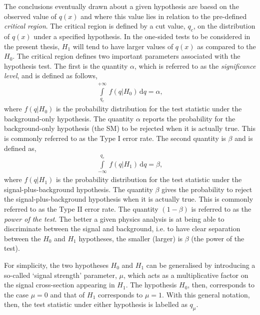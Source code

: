 The conclusions eventually drawn about a given hypothesis are baesd on the observed value
of $q(x)$ and where this value lies in relation to the pre-defined \textit{critical region}.
The critical region is defined by a cut value, $q_c$, on the distribution of $q(x)$ under a specified hypothesis.
In the one-sided tests to be considered in the present thesis, $H_1$
will tend to have larger values of $q(x)$ as compared to the $H_0$.
The critical region defines two important parameters associated with the hypothesis test.
The first is the quantity $\alpha$, which is referred to as the \textit{significance level},
and is defined as follows,
\begin{align}
    \int\limits_{q_c}^{+\infty} \, f(q | H_0) \, \mathrm{d}q = \alpha,
    \label{eq:sig_level}
\end{align}
where $f(q|H_0)$ is the probability distribution for the test statistic under
the background-only hypothesis.
The quantity $\alpha$ reports the probability for the background-only hypothesis (the SM) to be rejected when it is actually
true. This is commonly referred to as the Type I error rate.
The second quantity is $\beta$ and is defined as,
\begin{align}
    \int\limits_{-\infty}^{q_c} \, f(q|H_1) \, \mathrm{d}q = \beta,
    \label{eq:power_level}
\end{align}
where $f(q|H_1)$ is the probability distribution for the test statistic under
the signal-plus-background hypothesis.
The quantity $\beta$ gives the probability to reject the signal-plus-background hypothesis
when it is actually true. This is commonly referred to as the Type II error rate.
The quantity $(1-\beta)$ is referred to as the \textit{power of the test}.
The better a given physics analysis is at being able to discriminate between the signal
and background, i.e. to have clear separation between the $H_0$ and $H_1$ hypotheses,
the smaller (larger) is $\beta$ (the power of the test).

For simplicity, the two hypotheses $H_0$ and $H_1$ can be generalised by introducing a so-called
`signal strength' parameter, $\mu$, which acts as a multiplicative factor on the signal cross-section
appearing in $H_1$.
The hypothesis $H_0$, then, corresponds to the case $\mu = 0$ and that of $H_1$ corresponds to
$\mu = 1$.
With this general notation, then, the test statistic under either hypothesis is labelled as $q_{\mu}$.

